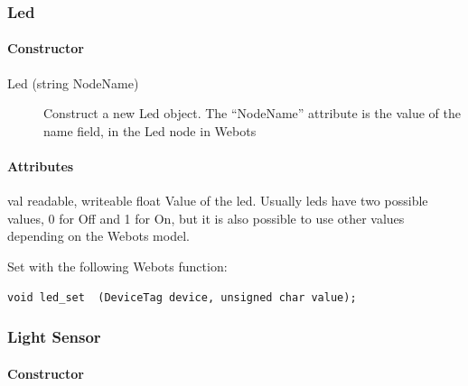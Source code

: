 \subsubsection{Led}
\label{webots.uobjects.robotdevices.led}%

\paragraph{Constructor}
\label{webots.uobjects.robotdevices.led.constructor}%

\noindent
\begin{description}
\item[{Led (string NodeName)}] Construct a new Led object. The ``NodeName'' attribute is the value
          of the name field, in the Led node in Webots

\end{description}

\paragraph{Attributes}
\label{webots.uobjects.robotdevices.led.attributes}%

\noindent
\begin{itemize}
\begin{attribute}{val}
  {readable, writeable}
  {float}
  {}
  Value of the led. Usually leds have two possible values,
 0 for Off and 1 for On, but it is also possible to use other values
 depending on the Webots model.


          Set with the following Webots function:


\begin{lstlisting}
void led_set  (DeviceTag device, unsigned char value);
\end{lstlisting}
\end{attribute}

\end{itemize}

\subsubsection{Light Sensor}
\label{webots.uobjects.robotdevices.lightsensor}%

\paragraph{Constructor}
\label{webots.uobjects.robotdevices.lightsensor.constructor}%

